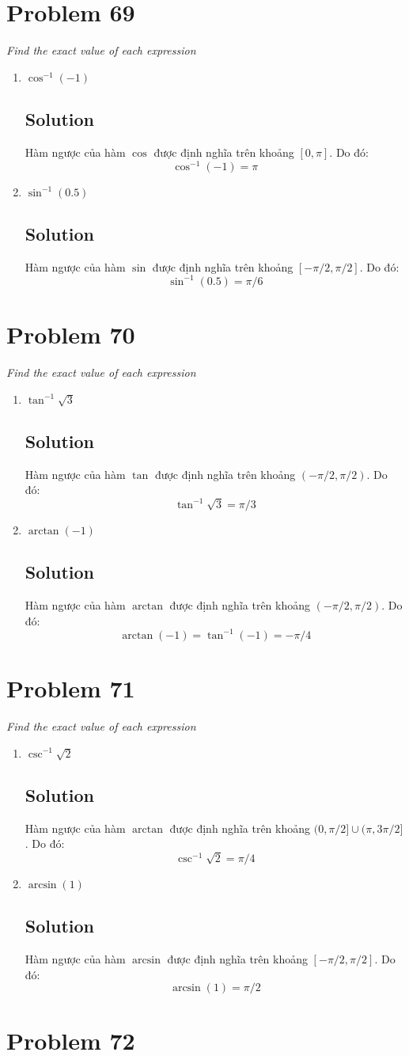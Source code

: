 \documentclass[11pt]{article}
\newcommand{\soln}{\subsection*}
\newcommand{\qn}{\textit}
\begin{document}
\section*{Problem 69}

\qn{Find the exact value of each expression}
\begin{enumerate}
	\item \qn{$\cos^{-1}(-1)$}
	\soln{Solution}
	Hàm ngược của hàm $\cos$ được định nghĩa trên khoảng $[0,\pi]$. Do đó: $$\cos^{-1}(-1)=\pi$$
	
	\item \qn{$\sin^{-1}(0.5)$}
	\soln{Solution}
	Hàm ngược của hàm $\sin$ được định nghĩa trên khoảng $[-\pi/2,\pi/2]$. Do đó: $$\sin^{-1}(0.5)=\pi/6$$
\end{enumerate}

\section*{Problem 70}

\qn{Find the exact value of each expression}
\begin{enumerate}
	\item \qn{$\tan^{-1}\sqrt{3}$}
	\soln{Solution}
	Hàm ngược của hàm $\tan$ được định nghĩa trên khoảng $(-\pi/2,\pi/2)$. Do đó: $$\tan^{-1}\sqrt{3}=\pi/3$$
	
	\item \qn{$\arctan(-1)$}
	\soln{Solution}
	Hàm ngược của hàm $\arctan$ được định nghĩa trên khoảng $(-\pi/2,\pi/2)$. Do đó: $$\arctan(-1)=\tan^{-1}(-1)=-\pi/4$$
\end{enumerate}

\section*{Problem 71}

\qn{Find the exact value of each expression}
\begin{enumerate}
	\item \qn{$\csc^{-1}\sqrt{2}$}
	\soln{Solution}
	Hàm ngược của hàm $\arctan$ được định nghĩa trên khoảng $(0, \pi/2] \cup (\pi,3\pi/2]$. Do đó: $$\csc^{-1}\sqrt{2}=\pi/4$$
	
	\item \qn{$\arcsin(1)$}
	\soln{Solution}
	Hàm ngược của hàm $\arcsin$ được định nghĩa trên khoảng $[-\pi/2,\pi/2]$. Do đó: $$\arcsin(1)=\pi/2$$
\end{enumerate}

\section*{Problem 72}
\end{document}
